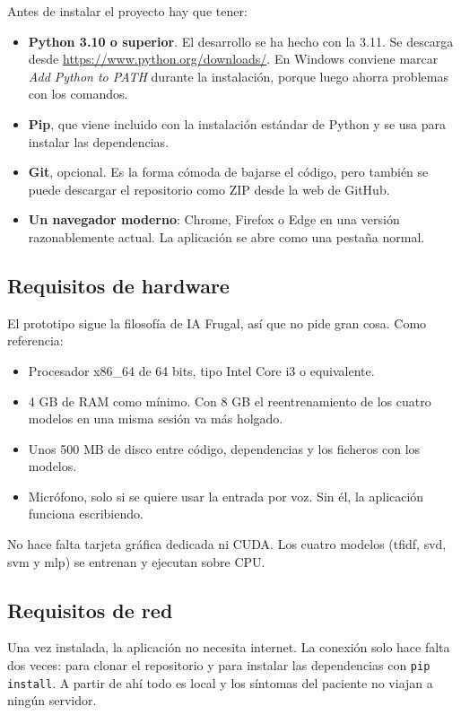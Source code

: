 Antes de instalar el proyecto hay que tener:

\begin{itemize}
	\item \textbf{Python 3.10 o superior}. El desarrollo se ha hecho con la 3.11. Se descarga desde \url{https://www.python.org/downloads/}. En Windows conviene marcar \textit{Add Python to PATH} durante la instalación, porque luego ahorra problemas con los comandos.
	\item \textbf{Pip}, que viene incluido con la instalación estándar de Python y se usa para instalar las dependencias.
	\item \textbf{Git}, opcional. Es la forma cómoda de bajarse el código, pero también se puede descargar el repositorio como ZIP desde la web de GitHub.
	\item \textbf{Un navegador moderno}: Chrome, Firefox o Edge en una versión razonablemente actual. La aplicación se abre como una pestaña normal.
\end{itemize}

\subsection*{Requisitos de hardware}

El prototipo sigue la filosofía de IA Frugal, así que no pide gran cosa. Como referencia:

\begin{itemize}
	\item Procesador x86\_64 de 64 bits, tipo Intel Core i3 o equivalente.
	\item 4 GB de RAM como mínimo. Con 8 GB el reentrenamiento de los cuatro modelos en una misma sesión va más holgado.
	\item Unos 500 MB de disco entre código, dependencias y los ficheros con los modelos.
	\item Micrófono, solo si se quiere usar la entrada por voz. Sin él, la aplicación funciona escribiendo.
\end{itemize}

No hace falta tarjeta gráfica dedicada ni CUDA. Los cuatro modelos (\acrshort{tfidf}, \acrshort{svd}, \acrshort{svm} y \acrshort{mlp}) se entrenan y ejecutan sobre CPU.

\subsection*{Requisitos de red}

Una vez instalada, la aplicación no necesita internet. La conexión solo hace falta dos veces: para clonar el repositorio y para instalar las dependencias con \texttt{pip install}. A partir de ahí todo es local y los síntomas del paciente no viajan a ningún servidor.


